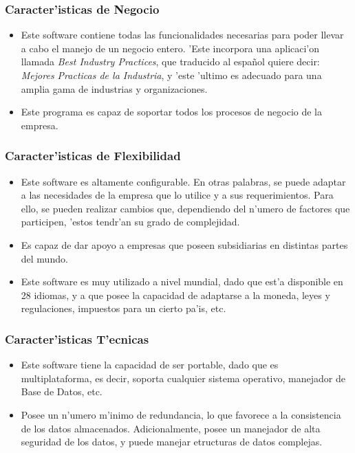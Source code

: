 \subsubsection{Caracter'isticas de Negocio}
\begin{itemize}
\item Este software contiene todas las funcionalidades necesarias para poder llevar a cabo el manejo de un negocio entero. 'Este incorpora una aplicaci'on llamada \textit{Best Industry Practices}, que traducido al espa\~nol quiere decir: \textit{Mejores Practicas de la Industria}, y 'este 'ultimo es adecuado para una amplia gama de industrias y organizaciones.
\item Este programa es capaz de soportar todos los procesos de negocio de la empresa.
\end{itemize}

\subsubsection{Caracter'isticas de Flexibilidad}
\begin{itemize}
\item Este software es altamente configurable. En otras palabras, se puede adaptar a las necesidades de la empresa que lo utilice y a sus requerimientos. Para ello, se pueden realizar cambios que, dependiendo del n'umero de factores que participen, 'estos tendr'an su grado de complejidad.
\item Es capaz de dar apoyo a empresas que poseen subsidiarias en distintas partes del mundo.
\item Este software es muy utilizado a nivel mundial, dado que est'a disponible en 28 idiomas, y a que posee la capacidad de adaptarse a la moneda, leyes y regulaciones, impuestos para un cierto pa'is, etc.
\end{itemize}

\subsubsection{Caracter'isticas T'ecnicas}
\begin{itemize}
\item Este software tiene la capacidad de ser portable, dado que es multiplataforma, es decir, soporta cualquier sistema operativo, manejador de Base de Datos, etc.
\item Posee un n'umero m'inimo de redundancia, lo que favorece a la consistencia de los datos almacenados. Adicionalmente, posee un manejador de alta seguridad de los datos, y puede manejar etructuras de datos complejas.
\end{itemize}

